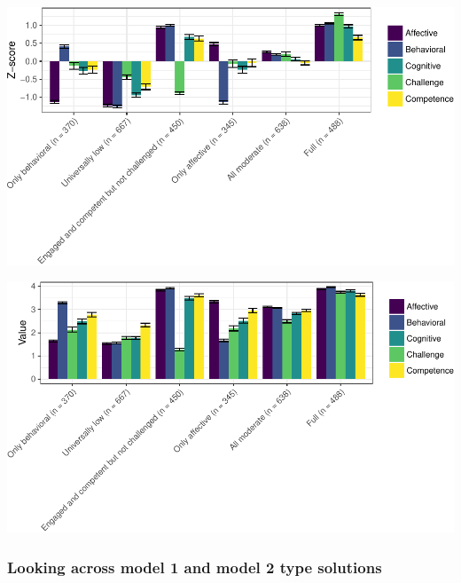 \documentclass[]{book}
\theoremstyle{definition}
\theoremstyle{definition}
\theoremstyle{definition}
\theoremstyle{remark}
\begin{document}
\begin{center}\includegraphics[width=0.95\linewidth]{rosenberg-dissertation_files/figure-latex/m1_6p-1} \end{center}

\begin{center}\includegraphics[width=0.95\linewidth]{rosenberg-dissertation_files/figure-latex/m1_6p-2} \end{center}

\subsubsection{Looking across model 1 and model 2 type
solutions}\label{looking-across-model-1-and-model-2-type-solutions}
\end{document}
